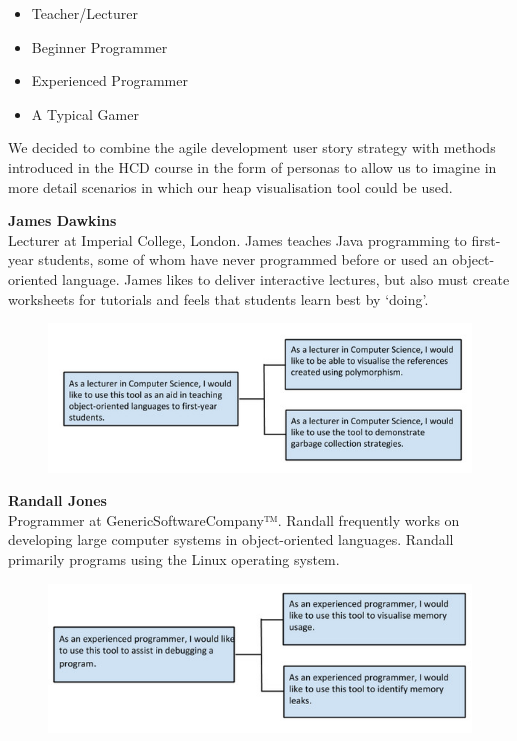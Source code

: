 \documentclass[10pt, a4paper]{article}
\begin{document}
\begin{itemize}

  \item Teacher/Lecturer
  \item Beginner Programmer
  \item Experienced Programmer 
  \item A Typical Gamer 

\end{itemize}

We decided to combine the agile development user story strategy with methods introduced in the HCD course in the form of personas to allow us to imagine in more detail scenarios in which our heap visualisation tool could be used.

\textbf{James Dawkins} 
\\ Lecturer at Imperial College, London. James teaches Java programming to first-year students, some of whom have never programmed before or used an object-oriented language. James likes to deliver interactive lectures, but also must create worksheets for tutorials and feels that students learn best by ‘doing’. 

\begin{figure}[h]
        \centering
        \includegraphics[width=\textwidth]{images/user1.jpg}
\end{figure}

\textbf{Randall Jones}
\\ Programmer at GenericSoftwareCompany™. Randall frequently works on developing large computer systems in object-oriented languages. Randall primarily programs using the Linux operating system.

\begin{figure}[h]
        \centering
        \includegraphics[width=\textwidth]{images/user2.jpg}
\end{figure} 
\end{document}
